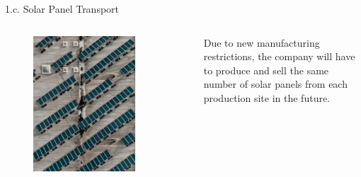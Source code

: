 \documentclass[aspectratio=1610,12pt]{beamer}
\begin{document}
\begin{frame}[fragile]{1.c. Solar Panel Transport}
\label{pic_strauss}
	\begin{columns}[onlytextwidth]
    	\center
    		\begin{figure}
    			\includegraphics[width=0.8\textwidth]{images/marcel-strauss-yfhAB5ry23A-unsplash.jpg}
       		\end{figure}
    		Due to new manufacturing restrictions, the company will have to produce and sell the same number of solar panels from each production site in the future.
    \end{columns}
\end{frame}
\end{document}
